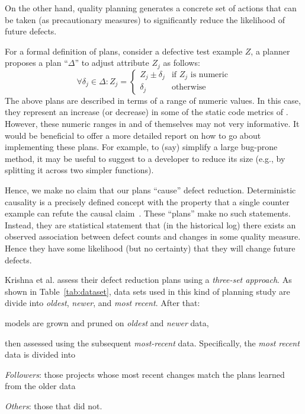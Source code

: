 On the other hand, quality planning generates a concrete set of actions that can be taken (as precautionary measures) to significantly reduce the likelihood of future defects.

For a formal definition of plans, consider a defective test example $Z$, a planner
proposes a plan ``$\Delta$'' to adjust attribute $Z_j$ as follows:
{\small\[
\forall \delta_j \in \Delta : Z_j = 
\begin{cases}
   Z_j \pm \delta_j& \text{if $Z_j$ is numeric}\\
  \delta_j       & \text{otherwise}
\end{cases}
\]}
The above plans are described in terms of a range of numeric values. In this case, they represent an increase (or decrease) in some of the static code metrics of . However, these numeric ranges in and of themselves may not very informative. It would be beneficial to offer a more detailed report on how to go about implementing these plans. For example, to (say) simplify a large bug-prone method, it may be useful to suggest to a developer to reduce its size (e.g., by splitting it across two simpler functions).



Hence, we make no claim   that 
our plans     ``cause'' defect reduction. Deterministic causality is a precisely defined concept with the property that a single counter example can refute the causal claim~\cite{AAAI_1990}. These ``plans'' make no such statements. Instead, they are statistical statement that (in the historical log) there exists an observed association   between
defect counts and changes in some   quality measure. Hence they have some  likelihood  (but  no  certainty)  that  they  will  change future defects.

Krishna et al. assess their defect reduction plans using a {\em three-set
 approach}. As shown in    Table~\ref{tab:dataset}, data sets used in this kind of planning study are  divide   into 
 {\em oldest},  {\em newer}, and   {\em most recent}. After that: 
 \bi
 \item models are grown and pruned on  {\em oldest} and  {\em newer} data,
 \item then assessed using the subsequent {\em most-recent} data.
Specifically, the  {\em most recent} data is divided into
\bi
\item {\em Followers}:  those projects whose most recent changes  match the plans learned from the older data
\item
{\em Others}:  those that did not.
\ei
\ei



